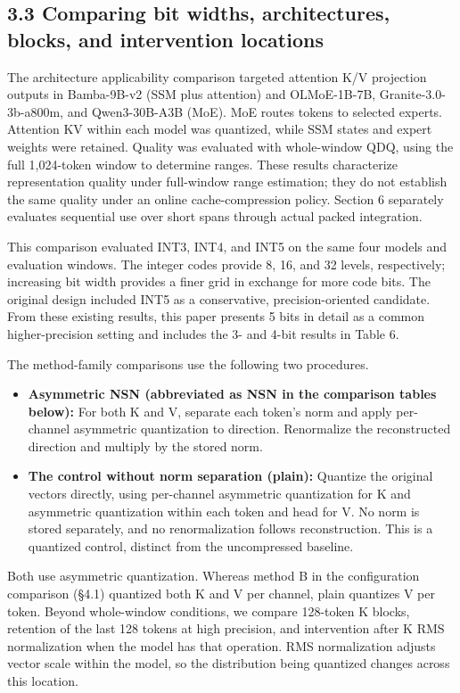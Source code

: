\documentclass[10pt,a4paper]{article}
\newcommand{\tightlist}{\setlength{\itemsep}{1pt}\setlength{\parskip}{0pt}}
\begin{document}
\subsection{3.3 Comparing bit widths, architectures, blocks, and intervention locations}\label{comparing-bit-widths-architectures-blocks-and-intervention-locations}

The architecture applicability comparison targeted attention K/V projection outputs in Bamba-9B-v2 (SSM plus attention) and OLMoE-1B-7B, Granite-3.0-3b-a800m, and Qwen3-30B-A3B (MoE). MoE routes tokens to selected experts. Attention KV within each model was quantized, while SSM states and expert weights were retained. Quality was evaluated with whole-window QDQ, using the full 1,024-token window to determine ranges. These results characterize representation quality under full-window range estimation; they do not establish the same quality under an online cache-compression policy. Section 6 separately evaluates sequential use over short spans through actual packed integration.

This comparison evaluated INT3, INT4, and INT5 on the same four models and evaluation windows. The integer codes provide 8, 16, and 32 levels, respectively; increasing bit width provides a finer grid in exchange for more code bits. The original design included INT5 as a conservative, precision-oriented candidate. From these existing results, this paper presents 5 bits in detail as a common higher-precision setting and includes the 3- and 4-bit results in Table 6.

The method-family comparisons use the following two procedures.

\begin{itemize}
\tightlist
\item
  \textbf{Asymmetric NSN (abbreviated as NSN in the comparison tables below):} For both K and V, separate each token's norm and apply per-channel asymmetric quantization to direction. Renormalize the reconstructed direction and multiply by the stored norm.
\item
  \textbf{The control without norm separation (plain):} Quantize the original vectors directly, using per-channel asymmetric quantization for K and asymmetric quantization within each token and head for V. No norm is stored separately, and no renormalization follows reconstruction. This is a quantized control, distinct from the uncompressed baseline.
\end{itemize}

Both use asymmetric quantization. Whereas method B in the configuration comparison (§4.1) quantized both K and V per channel, plain quantizes V per token. Beyond whole-window conditions, we compare 128-token K blocks, retention of the last 128 tokens at high precision, and intervention after K RMS normalization when the model has that operation. RMS normalization adjusts vector scale within the model, so the distribution being quantized changes across this location.
\end{document}
